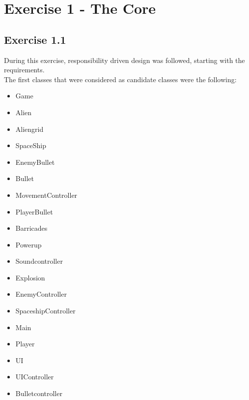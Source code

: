 \documentclass[10pt]{article}
\begin{document}
\section{Exercise 1 - The Core}

 \subsection{Exercise 1.1}

During this exercise, responsibility driven design was followed, starting with the requirements.\\
The first classes that were considered as candidate classes were the following:
\begin{itemize}
  \item Game
  \item Alien
  \item Aliengrid
  \item SpaceShip
  \item EnemyBullet
\item Bullet
\item MovementController
\item PlayerBullet
\item Barricades
\item Powerup
\item Soundcontroller
\item Explosion
\item EnemyController
\item SpaceshipController
\item Main
\item Player
\item UI
\item UIController
\item Bulletcontroller

\end{itemize}
\end{document}
